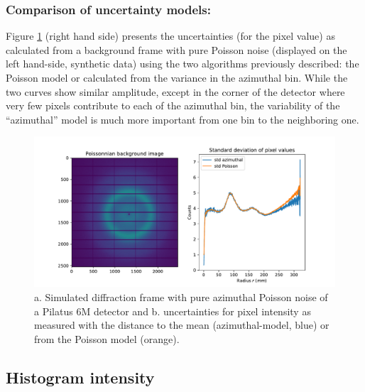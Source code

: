 \documentclass[preprint]{iucr}              %
\begin{document}
\subsubsection{Comparison of uncertainty models:}
Figure \ref{fig_std} (right hand side) presents the uncertainties (for the pixel value) as calculated from a background frame with pure Poisson noise (displayed on the left hand-side, synthetic data) using the two algorithms previously described: the Poisson model or calculated from the variance in the azimuthal bin.
While the two curves show similar amplitude, except in the corner of the detector where very few pixels contribute to each of the azimuthal bin, the variability of the ``azimuthal'' model is much more important from one bin to the neighboring one.
\begin{figure}
\label{fig_std}
\begin{center}
\includegraphics[width=14cm]{fig_std}
\caption{a. Simulated diffraction frame with pure azimuthal Poisson noise of a Pilatus 6M detector and b. uncertainties for pixel intensity as measured with the distance to the mean (azimuthal-model, blue) or from the Poisson model (orange).}
\end{center}
\end{figure}

\subsection{Histogram intensity }
\end{document}
